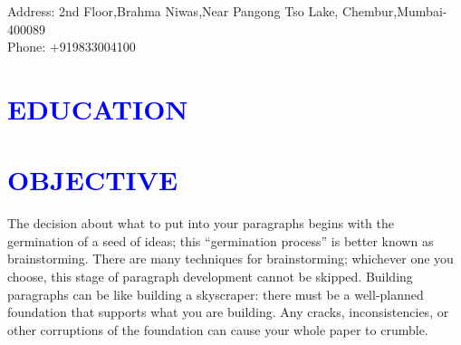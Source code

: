 \documentclass{article}
\begin{document}
\begin{flushleft}
\faHome  \hspace{1mm} Address: 2nd Floor,Brahma Niwas,Near Pangong Tso Lake, Chembur,Mumbai-400089 \\ 
\faPhone \hspace{1mm} Phone: +919833004100

\end{flushleft}


\section*{\large{\textcolor{blue}{\uppercase{education}}}}


\section*{\large{\textcolor{blue}{\uppercase{objective}}}}

\vspace{4pt}
The decision about what to put into your paragraphs begins with the germination of a seed of ideas; this “germination process” is better known as brainstorming. There are many techniques for brainstorming; whichever one you choose, this stage of paragraph development cannot be skipped. Building paragraphs can be like building a skyscraper: there must be a well-planned foundation that supports what you are building. Any cracks, inconsistencies, or other corruptions of the foundation can cause your whole paper to crumble.
\vspace{3pt}
\end{document}
